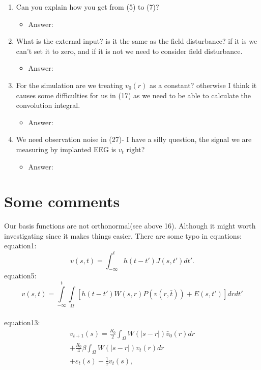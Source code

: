 \documentclass[a4paper,12pt]{article}
\begin{document}
\begin{enumerate}
 	\item Can you explain how you get from (5) to (7)?
	\begin{itemize}
 		\item Answer:
\end{itemize}
	\item What is the external input? is it the same as the field disturbance? if it is we can't set it to zero, and if it is not we need to consider field disturbance.
	\begin{itemize}
	 	\item  Answer:
	\end{itemize}
	\item For the simulation are we treating  $v_0(r)$ as a constant? otherwise I think it causes some difficulties for us in (17) as we need to be able to calculate the convolution integral.
	\begin{itemize}
		\item Answer:
	\end{itemize}
	\item We need observation noise in (27)- I have a silly question, the signal we are measuring by implanted EEG is $v_t$ right?
	\begin{itemize}
		\item Answer:
	\end{itemize}
\end{enumerate}
\section*{Some comments}
Our basis functions are not orthonormal(see above 16).  Although it might worth investigating since it makes things easier.
There are some typo in equations:
\\equation1:
\begin{equation}\label{Eq1}
v\left( {s,t} \right) = \int_{ - \infty }^t {h\left( {t - t'} \right)J\left( {s,t'} \right)dt'}.
\end{equation}
equation5:\\
\begin{equation}\label{Eq5}
v\left(s,t\right) = \int\limits_{-\infty}^t\int\limits_\Omega \left[ h\left(t - t'\right)W\left(s,r\right)P\left( v\left( r,\bar t \right)\right)+E\left(s,t'\right)\right] dr dt'
\end{equation}
\\equation13:
\begin{align}\label{Eq13}
 {v_{t + 1}}\left( s \right) = \frac{{{R_0}}}{2}\int_\Omega  {W\left( {\left| {s - r} \right|} \right){{\bar v}_0}\left( r \right)dr}  \nonumber \\
  + \frac{{{R_0}}}{4}\beta \int_\Omega  {W\left( {\left| {s - r} \right|} \right){v_t}\left( r \right)dr}  \\
  + {\varepsilon _t}\left( s \right) - \frac{1}{\tau }{v_t}\left( s \right), \nonumber
\end{align}
\end{document}
